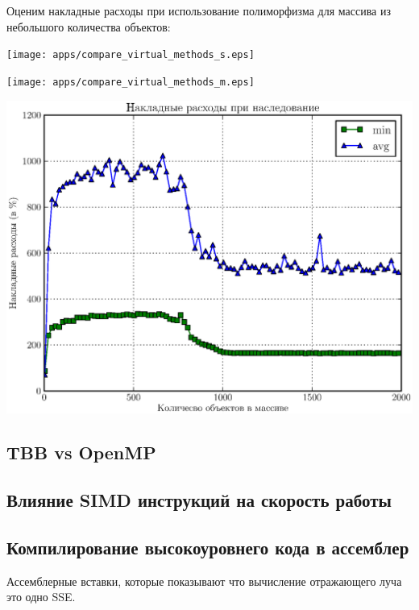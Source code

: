 \documentclass[12pt, a4paper]{article}
\begin{document}
Оценим накладные расходы при использование полиморфизма для массива из небольшого количества объектов:

{\hspace*{-2.25cm}\texttt{[image: apps/compare\_virtual\_methods\_s.eps]} }

{\hspace*{-2.25cm}\texttt{[image: apps/compare\_virtual\_methods\_m.eps]} }

{\hspace*{-2.25cm}\includegraphics[scale=1]{apps/compare_virtual_methods_b.eps} }

\subsection{TBB vs OpenMP}

\subsection{Влияние SIMD инструкций на скорость работы}

\subsection{Компилирование высокоуровнего кода в ассемблер}

Ассемблерные вставки, которые показывают что вычисление отражающего луча это одно SSE.


\newpage
\end{document}

